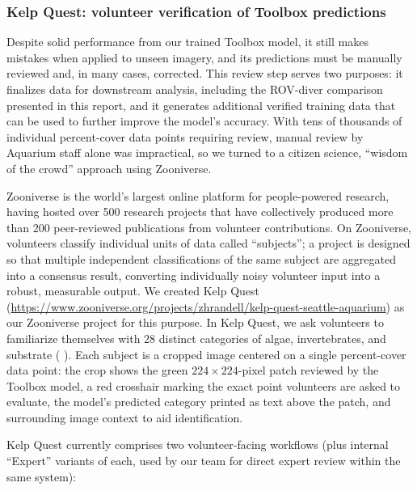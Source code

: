 \documentclass[11pt]{article}
\newcommand{\boxedref}[2]{%
	\begingroup
	\setlength{\fboxrule}{0.8pt}%
	\setlength{\fboxsep}{1.5pt}%
	\textcolor{linkcyan}{%
		\fbox{%
			\textcolor{black}{%
				\hyperref[#2]{#1~\ref*{#2}}%
			}%
		}%
	}%
	\endgroup
}
\newcommand{\figref}[1]{\boxedref{Fig.}{#1}}\newcommand{\tabref}[1]{\boxedref{Table}{#1}}
\begin{document}
\subsubsection{Kelp Quest: volunteer verification of Toolbox predictions}
\label{subsec:kelpquest}

Despite solid performance from our trained Toolbox model, it still makes 
mistakes when applied to unseen imagery, and its predictions must be manually 
reviewed and, in many cases, corrected.
This review step serves two purposes: it finalizes data for downstream 
analysis, including the ROV-diver comparison presented in this report, and it 
generates additional verified training data that can be used to further improve 
the model's accuracy.
With tens of thousands of individual percent-cover data points requiring 
review, manual review by Aquarium staff alone was impractical, so we turned to 
a citizen science, ``wisdom of the crowd'' approach using Zooniverse.

Zooniverse is the world's largest online platform for people-powered research, 
having hosted over 500 research projects that have collectively produced more 
than 200 peer-reviewed publications from volunteer contributions.
On Zooniverse, volunteers classify individual units of data called 
``subjects''; a project is designed so that multiple independent 
classifications of the same subject are aggregated into a consensus result, 
converting individually noisy volunteer input into a robust, measurable output.
We created Kelp Quest 
(\url{https://www.zooniverse.org/projects/zhrandell/kelp-quest-seattle-aquarium})
as our Zooniverse project for this purpose.
In Kelp Quest, we ask volunteers to familiarize themselves with 28 distinct 
categories of algae, invertebrates, and substrate 
(\figref{fig:kelpquest_categories}).
Each subject is a cropped image centered on a single 
percent-cover data point: the crop shows the green $224 \times 224$-pixel patch 
reviewed by the Toolbox model, a red crosshair marking the exact point 
volunteers are asked to evaluate, the model's predicted category printed as 
text above the patch, and surrounding image context to aid identification.

Kelp Quest currently comprises two volunteer-facing workflows (plus 
internal ``Expert'' variants of each, used by our team for direct expert 
review within the same system):
\end{document}
